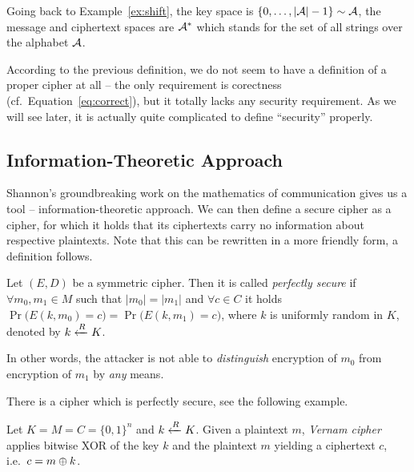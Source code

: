 \begin{note}
	Going back to Example~\ref{ex:shift}, the key space is $\{0 , \ldots , |{\cal A}|-1\}\sim\cal A$, the message and ciphertext spaces are ${\cal A}^*$ which stands for the set of all strings over the alphabet $\cal A$.
\end{note}

According to the previous definition, we do not seem to have a definition of a proper cipher at all -- the only requirement is corectness (cf.\ Equation~\ref{eq:correct}), but it totally lacks any security requirement. As we will see later, it is actually quite complicated to define ``security'' properly.



\subsection{Information-Theoretic Approach}

Shannon's groundbreaking work \cite{shannon1949mathematical} on the mathematics of communication gives us a tool -- information-theoretic approach. We can then define a secure cipher as a cipher, for which it holds that its ciphertexts carry no information about respective plaintexts. Note that this can be rewritten in a more friendly form, a definition follows.

\begin{defn}
\label{def:perfsec}
	Let $(E,D)$ be a symmetric cipher. Then it is called {\em perfectly secure} if $\forall m_0,m_1\in M$ such that $|m_0| = |m_1|$ and $\forall c\in C$ it holds $\Pr\bigl(E(k,m_0)=c\bigr) = \Pr\bigl(E(k,m_1)=c\bigr)$, where $k$ is uniformly random in $K$, denoted by $k\xleftarrow{R} K$.
\end{defn}

\begin{note}
\label{note:indist}
	In other words, the attacker is not able to {\em distinguish} encryption of $m_0$ from encryption of $m_1$ by {\em any} means.
\end{note}

There is a cipher which is perfectly secure, see the following example.

\begin{example}
	Let $K = M = C = \{0,1\}^n$ and $k\xleftarrow{R} K$. Given a plaintext $m$, {\em Vernam cipher} applies bitwise XOR of the key $k$ and the plaintext $m$ yielding a ciphertext $c$, i.e.\ $c = m\oplus k$.
\end{example}

